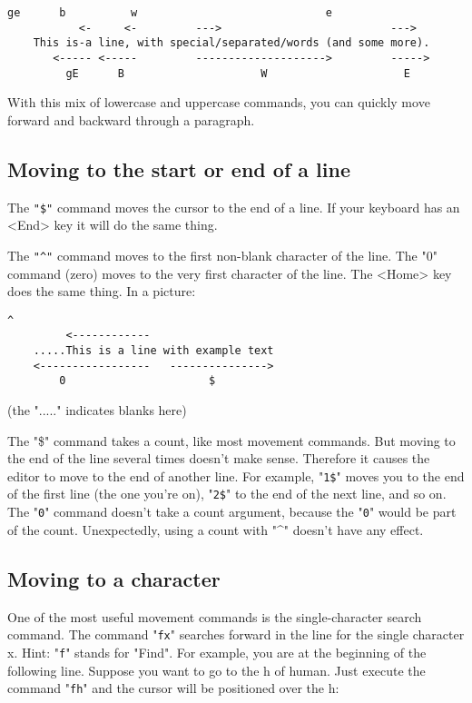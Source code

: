 \begin{Verbatim}[samepage=true]
           ge      b          w                             e
           <-     <-         --->                          --->
    This is-a line, with special/separated/words (and some more). 
       <----- <-----         -------------------->         ----->
         gE      B                     W                     E
\end{Verbatim}

With this mix of lowercase and uppercase commands, you can quickly move forward and backward through a paragraph.

\subsection{Moving to the start or end of a line}

The \verb!"$"! command moves the cursor to the end of a line.
If your keyboard has an <End> key it will do the same thing.

The \verb!"^"! command moves to the first non-blank character of the line.
The "0" command (zero) moves to the very first character of the line.
The <Home> key does the same thing.
In a picture:

\begin{Verbatim}[samepage=true]
               ^
         <------------
    .....This is a line with example text 
    <-----------------   --------------->
        0                      $
\end{Verbatim}

(the "....." indicates blanks here)

The "\$" command takes a count, like most movement commands.
But moving to the end of the line several times doesn't make sense.
Therefore it causes the editor to move to the end of another line.
For example, "\verb!1$!" moves you to the end of the first line (the one you're on), "\verb!2$!" to the end of the next line, and so on.
The "\verb!0!" command doesn't take a count argument, because the "\verb!0!" would be part of the count.
Unexpectedly, using a count with "\textasciicircum" doesn't have any effect.

\subsection{Moving to a character}
One of the most useful movement commands is the single-character search command.
The command "\verb!fx!" searches forward in the line for the single character x.
Hint: "\verb!f!" stands for "Find".
For example, you are at the beginning of the following line.
Suppose you want to go to the h of human.
Just execute the command "\verb!fh!" and the cursor will be positioned over the h:

